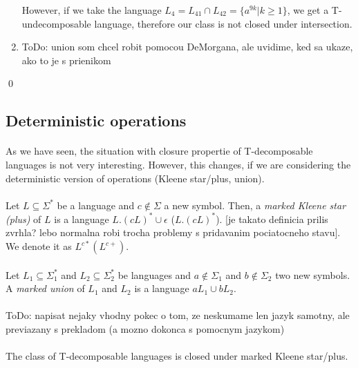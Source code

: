 \begin{enumerate}
However, if we take the language $L_4 = L_{41} \cap L_{42} = \{ a^{9k} | k \geq 1 \}$, we get a T-undecomposable language, therefore our class is not closed under intersection.

\item \color{red}ToDo: union som chcel robit pomocou DeMorgana, ale uvidime, ked sa ukaze, ako to je s prienikom\color{black}
\end{enumerate} \qed

\subsection{Deterministic operations}
\paragraph{}
As we have seen, the situation with closure propertie of T-decomposable languages is not very interesting. However, this changes, if we are considering the deterministic version of operations (Kleene star/plus, union).

\paragraph{}
 Let $L \subseteq \Sigma^*$ be a language and $c \notin \Sigma$ a new symbol. Then, a \emph{marked Kleene star (plus)} of $L$ is a language $L.(cL)^* \cup \epsilon$ ($L.(cL)^*$). \color{red}[je takato definicia prilis zvrhla? lebo normalna robi trocha problemy s pridavanim pociatocneho stavu]\color{black}. We denote it as $L^{c*} (L^{c+})$.

\paragraph{}
 Let $L_1 \subseteq \Sigma_1^*$ and $L_2 \subseteq \Sigma_2^*$ be languages and $a \notin \Sigma_1$ and $b \notin \Sigma_2$ two new symbols. A \emph{marked union} of $L_1$ and $L_2$ is a language $aL_1 \cup bL_2$.

\paragraph{}
\color{red}ToDo: napisat nejaky vhodny pokec o tom, ze neskumame len jazyk samotny, ale previazany s prekladom (a mozno dokonca s pomocnym jazykom)\color{black}

\paragraph{}
\cveta The class of T-decomposable languages is closed under marked Kleene star/plus.

